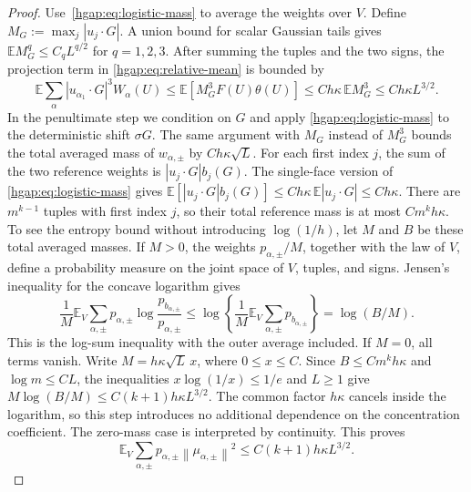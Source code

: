 \documentclass[11pt,letterpaper]{article}
\theoremstyle{remark}
\newcommand{\E}{\mathbb E}
\newcommand{\norm}[1]{\left\lVert#1\right\rVert}
\begin{document}
\begin{proof}
Use~\eqref{hgap:eq:logistic-mass} to average the weights over $V$.
Define $M_G:=\max_j|u_j\cdot G|$. A union bound for scalar Gaussian
tails gives $\E M_G^q\le C_qL^{q/2}$ for $q=1,2,3$.
After summing the tuples and the two signs, the projection term in
\eqref{hgap:eq:relative-mean} is bounded by
\[
 \E\sum_\alpha |u_{\alpha_1}\cdot G|^3W_\alpha(U)
 \le\E[M_G^3 F(U)\theta(U)]
 \le Ch\kappa\,\E M_G^3\le Ch\kappa L^{3/2}.
\]
In the penultimate step we condition on $G$ and apply
\eqref{hgap:eq:logistic-mass} to the deterministic shift $\sigma G$.
The same argument with $M_G$ instead of $M_G^3$ bounds the total
averaged mass of $w_{\alpha,\pm}$ by $Ch\kappa\sqrt L$.
For each first index $j$, the sum of the two reference weights is
$|u_j\cdot G|b_j(G)$. The single-face version of
\eqref{hgap:eq:logistic-mass} gives
$\E[|u_j\cdot G|b_j(G)]\le Ch\kappa\,\E|u_j\cdot G|
\le Ch\kappa$. There are $m^{k-1}$ tuples with first index $j$,
so their total reference mass is at most $Cm^kh\kappa$.
To see the entropy bound without introducing $\log(1/h)$, let $M$
and $B$ be these total averaged masses. If $M>0$, the weights
$p_{\alpha,\pm}/M$, together with the law of $V$, define a probability
measure on the joint space of $V$, tuples, and signs. Jensen's inequality
for the concave logarithm gives
\[
 \frac1M\E_V\sum_{\alpha,\pm}p_{\alpha,\pm}
       \log\frac{p_{b_{\alpha,\pm}}}{p_{\alpha,\pm}}
 \le\log\left\{\frac1M\E_V\sum_{\alpha,\pm}
                                      p_{b_{\alpha,\pm}}\right\}
 =\log(B/M).
\]
This is the log-sum inequality with the outer average included.
If $M=0$, all terms vanish. Write $M=h\kappa\sqrt L\,x$, where
$0\le x\le C$. Since $B\le Cm^kh\kappa$ and $\log m\le CL$, the
inequalities $x\log(1/x)\le1/e$ and $L\ge1$ give
$M\log(B/M)\le C(k+1)h\kappa L^{3/2}$. The common factor
$h\kappa$ cancels inside the logarithm, so this step introduces no
additional dependence on the concentration coefficient. The zero-mass case is interpreted
by continuity. This proves
\begin{equation}
 \E_V\sum_{\alpha,\pm}p_{\alpha,\pm}
                   \norm{\mu_{\alpha,\pm}}^2\le C(k+1)h\kappa L^{3/2}.
 \label{hgap:eq:cubic-means}
\end{equation}


\end{proof}
\end{document}
